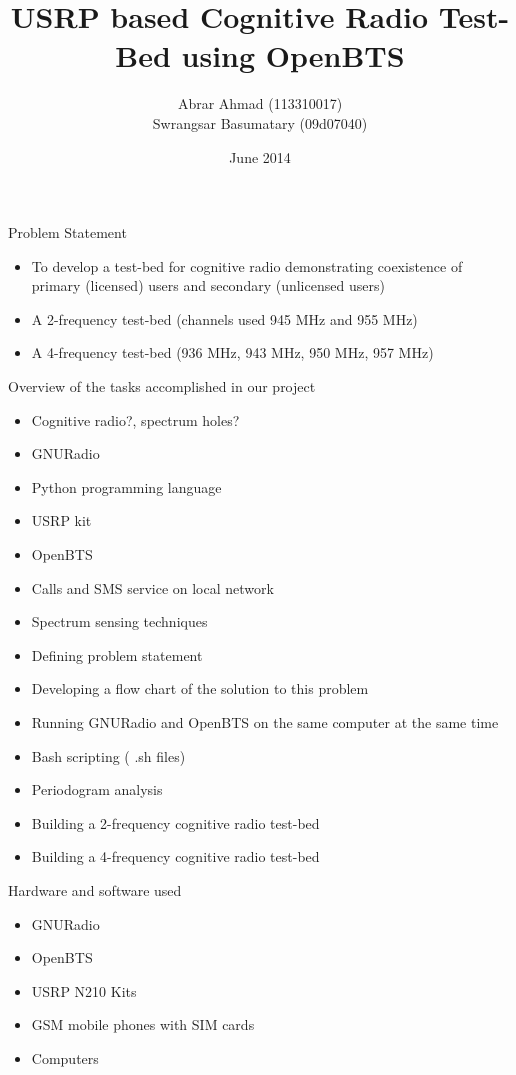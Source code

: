 \documentclass{beamer}
\title{USRP based Cognitive Radio Test-Bed using OpenBTS}
\author{Abrar Ahmad (113310017) \\ Swrangsar Basumatary (09d07040)}
\institute{Department of Electrical Engineering \\ IIT Bombay, Powai}
\date{June 2014}
\begin{document}
  \frame{\titlepage}


	\begin{frame}{Problem Statement}
    	\begin{itemize}
    		\item To develop a test-bed for cognitive radio demonstrating coexistence of primary (licensed) users and secondary (unlicensed users)
    		\item A 2-frequency test-bed (channels used 945 MHz and 955 MHz)
    		\item A 4-frequency test-bed (936 MHz, 943 MHz, 950 MHz, 957 MHz)
    	\end{itemize}
	\end{frame}
	
	\begin{frame}{Overview of the tasks accomplished in our project}
		\begin{itemize}
      \item Cognitive radio?,  spectrum holes?
      \item GNURadio
      \item Python programming language
      \item USRP kit
      \item OpenBTS
      \item Calls and SMS service on local network
      \item Spectrum sensing techniques
      \item Defining problem statement
    \end{itemize}
  \end{frame}
    
    \begin{frame}{}
        \begin{itemize}
		\item Developing a flow chart of the solution to this problem
		\item Running GNURadio and OpenBTS  on the same computer at the same time
		\item Bash scripting ( .sh files)
		\item Periodogram analysis
		\item Building a 2-frequency cognitive radio test-bed
		\item Building a 4-frequency cognitive radio test-bed
		\end{itemize}
	\end{frame}
	
	\begin{frame}{Hardware and software used}
    \begin{itemize}
      \item GNURadio
      \item OpenBTS
      \item USRP N210  Kits
      \item GSM mobile phones with SIM cards
      \item Computers
    \end{itemize}
  \end{frame}
\end{document}

